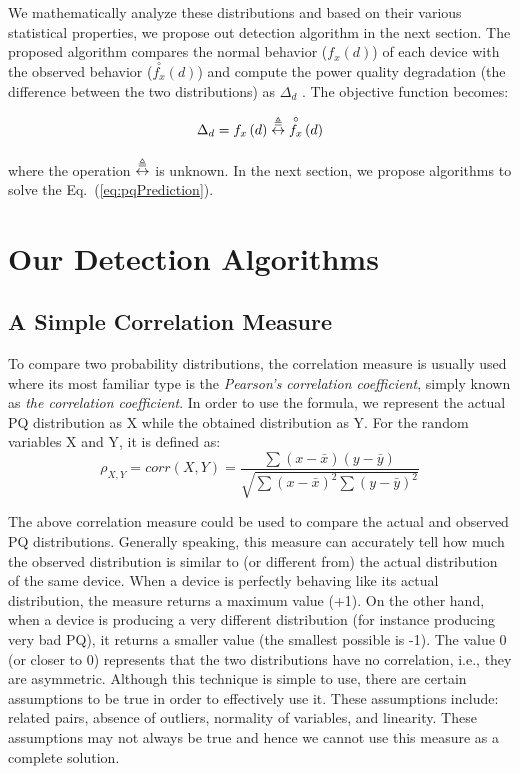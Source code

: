 We mathematically analyze these distributions and based on their various statistical properties, we propose out detection algorithm in the next section. The proposed algorithm compares the normal behavior ($f_x\left(d\right)$) of each device with the observed behavior ($\overset{\circ}{f_x}\left(d\right)$) and compute the power quality degradation (the difference between the two distributions) as $\Delta_d$ . The objective function becomes:

\begin{equation}
\label{eq:pqPrediction}
\Delta_d = f_x\left(d\right) \mathrel{\overset\triangleq\leftrightarrow} \overset{\circ}{f_x}\left(d\right)
\end{equation}

\noindent where the operation $\mathrel{\overset\triangleq\leftrightarrow}$ is unknown. In the next section,  we propose algorithms to solve the Eq.~(\ref{eq:pqPrediction}).

\section{Our Detection Algorithms}
\subsection{A Simple Correlation Measure}
To compare two probability distributions, the correlation measure is usually used where its most familiar type is the \textit{Pearson's correlation coefficient}, simply known as \textit{the correlation coefficient}. In order to use the formula, we represent the actual PQ distribution as X while the obtained distribution as Y. For the random variables X and Y, it is defined as:
\[\rho_{X,Y} = corr(X,Y) = \frac{\sum (x-\bar x) (y-\bar y)}{\sqrt{\sum (x-\bar x)^2 \sum (y-\bar y)^2}}\]

The above correlation measure could be used to compare the actual and observed PQ distributions. Generally speaking, this measure can accurately tell how much the observed distribution is similar to (or different from) the actual distribution of the same device. When a device is perfectly behaving like its actual distribution, the measure returns a maximum value (+1). On the other hand, when a device is producing a very different distribution (for instance producing very bad PQ), it returns a smaller value (the smallest possible is -1). The value 0 (or closer to 0) represents that the two distributions have no correlation, i.e., they are asymmetric. Although this technique is simple to use, there are certain assumptions to be true in order to effectively use it. These assumptions include: related pairs, absence of outliers, normality of variables, and linearity. These assumptions may not always be true and hence we cannot use this measure as a complete solution.

